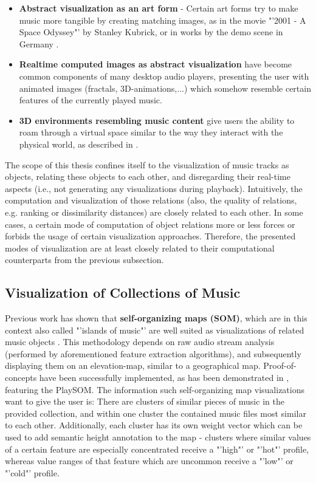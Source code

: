 \begin{itemize}
	\item \textbf{Abstract visualization as an art form} - Certain art forms try to make music more tangible by creating matching images, as in the movie "'2001 - A Space Odyssey"' by Stanley Kubrick, or in works by the demo scene in Germany \cite{Scheib:2002}.
	\item \textbf{Realtime computed images as abstract visualization} have become common components of many desktop audio players, presenting the user with animated images (fractals, 3D-animations,...) which somehow resemble certain features of the currently played music.
	\item \textbf{3D environments resembling music content} give users the ability to roam through a virtual space similar to the way they interact with the physical world, as described in \cite{Dittenbach:2007}.
\end{itemize}

The scope of this thesis confines itself to the visualization of music tracks as objects, relating these objects to each other, and disregarding their real-time aspects (i.e., not generating any visualizations during playback). Intuitively, the computation and visualization of those relations (also, the quality of relations, e.g. ranking or dissimilarity distances) are closely related to each other. In some cases, a certain mode of computation of object relations more or less forces or forbids the usage of certain visualization approaches. Therefore, the presented modes of visualization are at least closely related to their computational counterparts from the previous subsection.

\subsection{Visualization of Collections of Music}

Previous work has shown that \textbf{self-organizing maps (SOM)}, which are in this context also called "'islands of music"' are well suited as visualizations of related music objects \cite{Cooper:2006:VAM}. This methodology depends on raw audio stream analysis (performed by aforementioned feature extraction algorithms), and subsequently displaying them on an elevation-map, similar to a geographical map. Proof-of-concepts have been successfully implemented, as has been demonstrated in \cite{NeuDitRau-05ismir}, featuring the PlaySOM. The information such self-organizing map visualizations want to give the user is: There are clusters of similar pieces of music in the provided collection, and within one cluster the contained music files most similar to each other. Additionally, each cluster has its own weight vector which can be used to add semantic height annotation to the map - clusters where similar values of a certain feature are especially concentrated receive a "'high"' or "'hot"' profile, whereas value ranges of that feature which are uncommon receive a "'low"' or "'cold"' profile.

